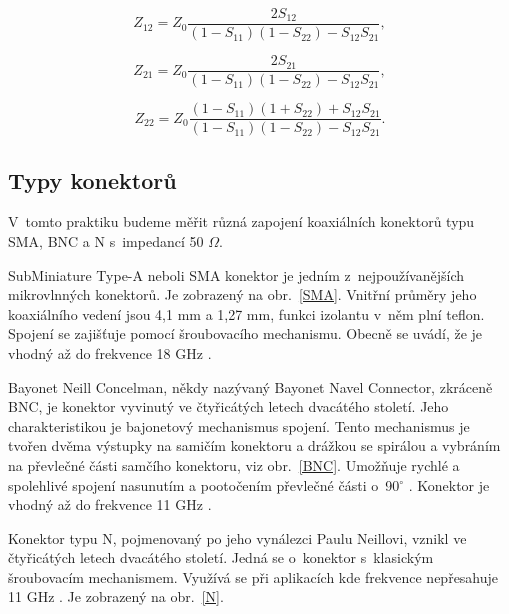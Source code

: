 \documentclass{protokol}
\begin{document}
\begin{equation}
	Z_{12} = Z_0
	\frac{2S_{12}}{(1-S_{11})(1-S_{22})-S_{12}S_{21}},
\end{equation}

\begin{equation}
	Z_{21} = Z_0
	\frac{2S_{21}}{(1-S_{11})(1-S_{22})-S_{12}S_{21}},
\end{equation}

\begin{equation}
	Z_{22} = Z_0
	\frac{(1-S_{11})(1+S_{22})+S_{12}S_{21}}{(1-S_{11})(1-S_{22})-S_{12}S_{21}}.
\end{equation}

\subsection{Typy konektorů}
V~tomto praktiku budeme měřit různá zapojení koaxiálních konektorů typu
SMA, BNC a N s~impedancí 50 $\Omega$.

SubMiniature Type-A neboli SMA konektor je jedním z~nejpoužívanějších
mikrovlnných konektorů. Je zobrazený na obr.~\ref{SMA}.
Vnitřní průměry jeho koaxiálního vedení jsou 4,1 mm a 1,27 mm,
funkci izolantu v~něm plní teflon.
Spojení se zajišťuje pomocí šroubovacího mechanismu.
Obecně se uvádí, že je vhodný až do frekvence 18 GHz \cite{rfhandbook}.

Bayonet Neill Concelman, někdy nazývaný Bayonet Navel Connector,
zkráceně BNC, je konektor vyvinutý ve čtyřicátých letech dvacátého století.
Jeho charakteristikou je bajonetový mechanismus spojení.
Tento mechanismus je tvořen dvěma výstupky na samičím konektoru
a drážkou se spirálou a vybráním na převlečné části samčího konektoru,
viz obr.~\ref{BNC}.
Umožňuje rychlé a spolehlivé spojení nasunutím a pootočením převlečné
části o~90$^{\circ}$ \cite{czwiki}.
Konektor je vhodný až do frekvence 11 GHz \cite{rfhandbook}.

Konektor typu N, pojmenovaný po jeho vynálezci Paulu Neillovi,
vznikl ve čtyřicátých letech dvacátého století.
Jedná se o~konektor s~klasickým šroubovacím mechanismem.
Využívá se při aplikacích kde frekvence nepřesahuje 11 GHz \cite{rfhandbook}.
Je zobrazený na obr.~\ref{N}.
\end{document}
